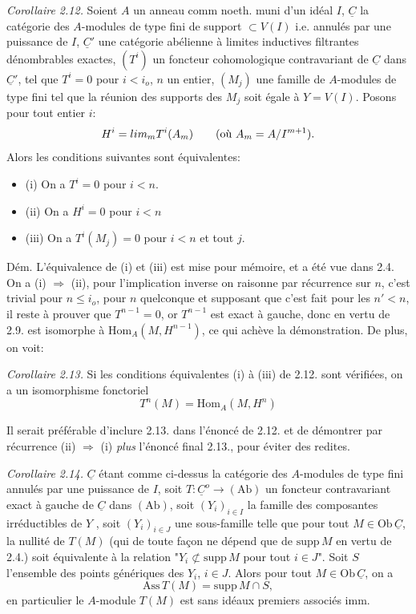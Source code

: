 \documentclass[11pt,a4paper]{article}
\begin{document}
\emph{Corollaire 2.12.} Soient $A$ un anneau comm noeth. muni d'un idéal $I$, $\underline{C}$ la catégorie des $A$-modules de type fini de support $\subset V(I)$ i.e. annulés par une puissance de $I$, $\underline{C}'$ une catégorie abélienne à limites inductives filtrantes dénombrables exactes, $(T^i)$ un foncteur cohomologique contravariant de $\underline{C}$ dans $\underline{C}'$, tel que $T^i = 0$ pour $i < i_o$, $n$ un entier, $(M_j)$ une famille de $A$-modules de type fini tel que la réunion des supports des $M_j$ soit égale à $Y = V(I)$. \struck{\ill{}} Posons pour tout entier $i$:
\[
  H^i = \varinjlim_m T^i(A_m) \qquad (\text{où } A_m = A/I^{m+1}) .
\]
Alors les conditions suivantes sont équivalentes:
\begin{itemize}
  \item (i) On a $T^i = 0$ pour $i < n$.
  \item (ii) On a $H^i = 0$ pour $i < n$
  \item (iii) On a $T^i(M_j) = 0$ pour $i < n$ et tout $j$.
\end{itemize}

Dém. L'équivalence de (i) et (iii) est mise pour mémoire, et a été vue dans 2.4. On a (i) $\Rightarrow$ (ii), pour l'implication inverse on raisonne par récurrence sur $n$, c'est trivial pour $n \leqslant i_o$, pour $n$ quelconque et supposant que c'est fait pour les $n' < n$, il reste à prouver que $T^{n-1} = 0$, or $T^{n-1}$ est exact à gauche, donc en vertu de 2.9. est isomorphe à $\mathrm{Hom}_A(M, H^{n-1})$,   ce qui achève la démonstration. De plus, on voit:

\emph{Corollaire 2.13.} Si les conditions équivalentes (i) à (iii) de 2.12. sont vérifiées, on a un isomorphisme fonctoriel
\[
  T^{n}(M) = \mathrm{Hom}_A(M, H^{n})
\]

Il serait préférable d'inclure 2.13. dans l'énoncé de 2.12. et de démontrer par récurrence (ii) $\Rightarrow$ (i) \emph{plus} l'énoncé final 2.13., pour éviter des redites.

\emph{Corollaire 2.14.} $\underline{C}$ étant comme ci-dessus la catégorie des $A$-modules de type fini annulés par une puissance de $I$, soit $T : \underline{C}^{o} \to (\mathrm{Ab})$ un foncteur contravariant exact à gauche de $\underline{C}$ dans $(\mathrm{Ab})$, soit $(Y_i)_{i \in I}$ la famille des composantes irréductibles de $Y$ ,  soit $(Y_i)_{i \in J}$ une sous-famille telle que pour tout $M \in \mathrm{Ob}\,\underline{C}$, la nullité de $T(M)$ (qui de toute façon ne dépend que de $\mathrm{supp}\, M$ en vertu de 2.4.) soit équivalente à la relation "$Y_i \not\subset \mathrm{supp}\, M$  pour tout $i \in J$". Soit $S$  l'ensemble des points génériques des $Y_i$, $i \in J$. Alors pour tout $M \in \mathrm{Ob}\,\underline{C}$, on a
\[
  \mathrm{Ass}\, T(M) = \mathrm{supp}\, M \cap S ,
\]
en particulier le $A$-module $T(M)$ est sans idéaux premiers associés imm.
\end{document}
